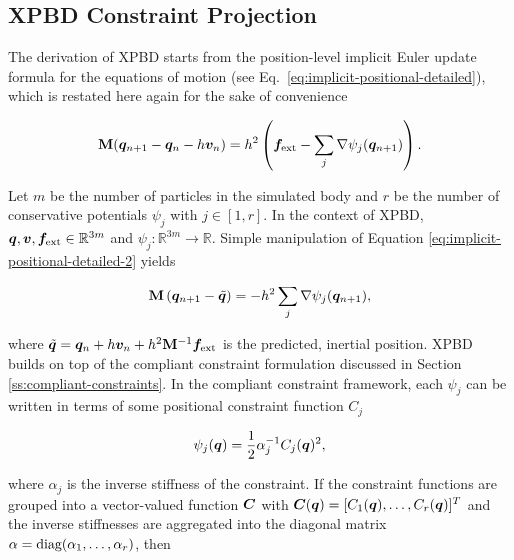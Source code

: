 \subsection{XPBD Constraint Projection}\label{ss:xpbd-constraint-projection}
The derivation of XPBD \cite{macklin2016} starts from the position-level implicit Euler update formula for the equations of motion 
(see Eq.\ \ref{eq:implicit-positional-detailed}), which is restated here again for the sake of convenience

\begin{equation}\label{eq:implicit-positional-detailed-2}
    \mathbf{M}(\bm{q}_{n+1} - \bm{q}_n - h\bm{v}_n) = h^2\left(\bm{f_\text{ext}} - \sum_j \nabla \psi_j(\bm{q}_{n+1})\right).
\end{equation}

\noindent Let $m$ be the number of particles in the simulated body and $r$ be the number of conservative potentials $\psi_j$ with $j \in [1, r]$.
In the context of XPBD, $\bm{q}, \bm{v}, \bm{f}_{\text{ext}} \in \mathbb{R}^{3m}$ and $\psi_j \colon \mathbb{R}^{3m} \to \mathbb{R}$. Simple 
manipulation of Equation \ref{eq:implicit-positional-detailed-2} yields

\begin{equation}\label{eq:implicit-positional-detailed-3}
    \mathbf{M} \left( \bm{q}_{n+1} - \tilde{\bm{q}} \right) = - h^2 \sum_j \nabla \psi_j(\bm{q}_{n+1}),
\end{equation}

\noindent where $\tilde{\bm{q}} = \bm{q}_n + h\bm{v}_n + h^2 \mathbf{M}^{-1} \bm{f}_{\text{ext}}$ is the predicted, inertial position. XPBD builds on
top of the compliant constraint formulation discussed in Section \ref{ss:compliant-constraints}. In the compliant constraint framework, each $\psi_j$ 
can be written in terms of some positional constraint function $C_j$ 

\begin{equation}\label{eq:xpbd-potential-j}
    \psi_j(\bm{q}) = \frac{1}{2} \alpha^{-1}_j C_j(\bm{q})^2,
\end{equation}

\noindent where $\alpha_j$ is the inverse stiffness of the constraint. If the constraint functions are grouped into a vector-valued function
$\bm{C}$ with $\bm{C}(\bm{q}) = [C_1(\bm{q}), \ldots, C_r(\bm{q})]^T$ and the inverse stiffnesses are aggregated into the diagonal matrix
$\mathbf{\alpha} = \text{diag}(\alpha_1, \ldots, \alpha_r)$, then

